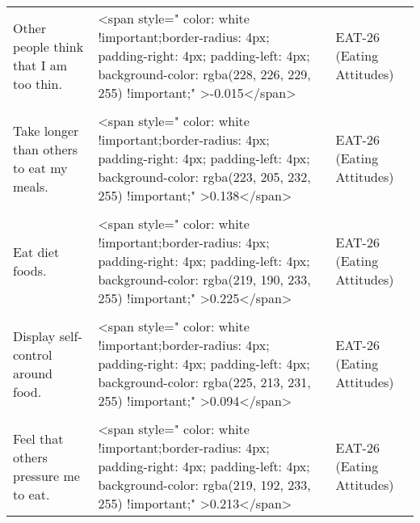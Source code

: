 \documentclass[border=1mm]{standalone}
\begin{document}
\begin{longtable}{lll}
Other people think that I am too thin. & <span style="     color: white !important;border-radius: 4px; padding-right: 4px; padding-left: 4px; background-color: rgba(228, 226, 229, 255) !important;" >-0.015</span> & EAT-26 (Eating Attitudes)\\
\cellcolor{gray!10}{Am preoccupied with the thought of having fat on my body.} & \cellcolor{gray!10}{<span style="     color: white !important;border-radius: 4px; padding-right: 4px; padding-left: 4px; background-color: rgba(221, 198, 232, 255) !important;" >0.18</span>} & \cellcolor{gray!10}{EAT-26 (Eating Attitudes)}\\
Take longer than others to eat my meals. & <span style="     color: white !important;border-radius: 4px; padding-right: 4px; padding-left: 4px; background-color: rgba(223, 205, 232, 255) !important;" >0.138</span> & EAT-26 (Eating Attitudes)\\
\cellcolor{gray!10}{Avoid foods with sugar in them.} & \cellcolor{gray!10}{<span style="     color: white !important;border-radius: 4px; padding-right: 4px; padding-left: 4px; background-color: rgba(223, 206, 231, 255) !important;" >0.133</span>} & \cellcolor{gray!10}{EAT-26 (Eating Attitudes)}\\
\addlinespace
Eat diet foods. & <span style="     color: white !important;border-radius: 4px; padding-right: 4px; padding-left: 4px; background-color: rgba(219, 190, 233, 255) !important;" >0.225</span> & EAT-26 (Eating Attitudes)\\
\cellcolor{gray!10}{Feel that food controls my life.} & \cellcolor{gray!10}{<span style="     color: white !important;border-radius: 4px; padding-right: 4px; padding-left: 4px; background-color: rgba(222, 203, 232, 255) !important;" >0.152</span>} & \cellcolor{gray!10}{EAT-26 (Eating Attitudes)}\\
Display self-control around food. & <span style="     color: white !important;border-radius: 4px; padding-right: 4px; padding-left: 4px; background-color: rgba(225, 213, 231, 255) !important;" >0.094</span> & EAT-26 (Eating Attitudes)\\
\cellcolor{gray!10}{Avoid eating when I am hungry.} & \cellcolor{gray!10}{<span style="     color: white !important;border-radius: 4px; padding-right: 4px; padding-left: 4px; background-color: rgba(214, 175, 234, 255) !important;" >0.314</span>} & \cellcolor{gray!10}{EAT-26 (Eating Attitudes)}\\
Feel that others pressure me to eat. & <span style="     color: white !important;border-radius: 4px; padding-right: 4px; padding-left: 4px; background-color: rgba(219, 192, 233, 255) !important;" >0.213</span> & EAT-26 (Eating Attitudes)\\

\end{longtable}
\end{document}
